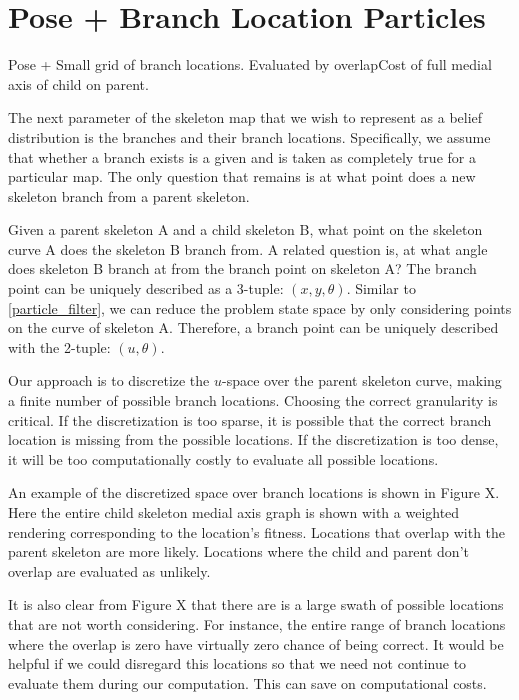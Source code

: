 \section{Pose + Branch Location Particles}
\label{posebranchlocationparticles}

Pose + Small grid of branch locations. Evaluated by overlapCost of full medial axis of child on parent.

The next parameter of the skeleton map that we wish to represent as a belief distribution is the branches and their branch locations. Specifically, we assume that whether a branch exists is a given and is taken as completely true for a particular map. The only question that remains is at what point does a new skeleton branch from a parent skeleton.

Given a parent skeleton A and a child skeleton B, what point on the skeleton curve A does the skeleton B branch from. A related question is, at what angle does skeleton B branch at from the branch point on skeleton A? The branch point can be uniquely described as a 3-tuple: $ (x,y,\theta) $. Similar to \autoref{particle_filter}, we can reduce the problem state space by only considering points on the curve of skeleton A. Therefore, a branch point can be uniquely described with the 2-tuple: $ (u, \theta) $.

Our approach is to discretize the $u$-space over the parent skeleton curve, making a finite number of possible branch locations. Choosing the correct granularity is critical. If the discretization is too sparse, it is possible that the correct branch location is missing from the possible locations. If the discretization is too dense, it will be too computationally costly to evaluate all possible locations.

An example of the discretized space over branch locations is shown in Figure X. Here the entire child skeleton medial axis graph is shown with a weighted rendering corresponding to the location's fitness. Locations that overlap with the parent skeleton are more likely. Locations where the child and parent don't overlap are evaluated as unlikely.

It is also clear from Figure X that there are is a large swath of possible locations that are not worth considering. For instance, the entire range of branch locations where the overlap is zero have virtually zero chance of being correct. It would be helpful if we could disregard this locations so that we need not continue to evaluate them during our computation. This can save on computational costs.


